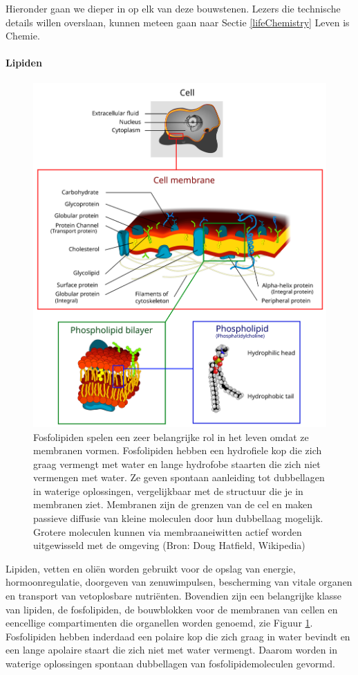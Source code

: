 \documentclass[
  11pt,
]{book}
\begin{document}
Hieronder gaan we dieper in op elk van deze bouwstenen. Lezers die technische details willen overslaan, kunnen meteen gaan naar Sectie \ref{lifeChemistry} Leven is Chemie.

\hypertarget{lipiden}{%
\paragraph{Lipiden}\label{lipiden}}

\begin{figure}

{\centering \includegraphics[width=0.8\linewidth]{./figs/Cell_membrane_detailed_diagram_4} 

}

\caption{Fosfolipiden spelen een zeer belangrijke rol in het leven omdat ze membranen vormen. Fosfolipiden hebben een hydrofiele kop die zich graag vermengt met water en lange hydrofobe staarten die zich niet vermengen met water. Ze geven spontaan aanleiding tot dubbellagen in waterige oplossingen, vergelijkbaar met de structuur die je in membranen ziet. Membranen zijn de grenzen van de cel en maken passieve diffusie van kleine moleculen door hun dubbellaag mogelijk. Grotere moleculen kunnen via membraaneiwitten actief worden uitgewisseld met de omgeving (Bron: Doug Hatfield, Wikipedia)}\label{fig:lipids}
\end{figure}

Lipiden, vetten en oliën worden gebruikt voor de opslag van energie, hormoonregulatie, doorgeven van zenuwimpulsen, bescherming van vitale organen en transport van vetoplosbare nutriënten. Bovendien zijn een belangrijke klasse van lipiden, de fosfolipiden, de bouwblokken voor de membranen van cellen en eencellige compartimenten die organellen worden genoemd, zie Figuur \ref{fig:lipids}. Fosfolipiden hebben inderdaad een polaire kop die zich graag in water bevindt en een lange apolaire staart die zich niet met water vermengt. Daarom worden in waterige oplossingen spontaan dubbellagen van fosfolipidemoleculen gevormd.
\end{document}
